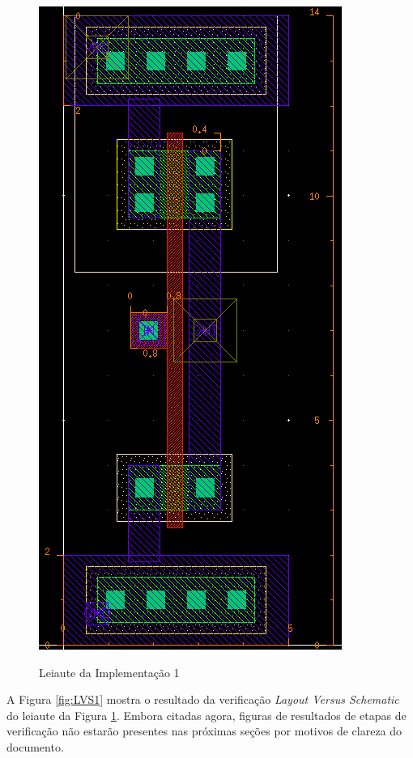 \documentclass{iiufrgs}
\begin{document}
\begin{figure}[htbp]
    \centering
    \caption{Leiaute da Implementação 1}
    \includegraphics[scale=0.8]{images/layout1.png}
    \label{fig:leiaute1}
\end{figure}

\FloatBarrier

A Figura \ref{fig:LVS1} mostra o resultado da verificação \textit{Layout Versus Schematic} do leiaute da Figura \ref{fig:leiaute1}. Embora citadas agora, figuras de resultados de etapas de verificação não estarão presentes nas próximas seções por motivos de clareza do documento.
\end{document}
